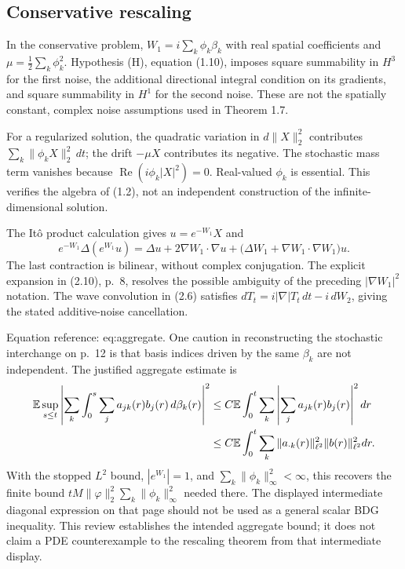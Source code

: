 \documentclass[10pt]{article}
\begin{document}
\subsection*{Conservative rescaling}
In the conservative problem, \(W_1=i\sum_k\phi_k\beta_k\) with real spatial coefficients and \(\mu=\frac12\sum_k\phi_k^2\). Hypothesis (H), equation (1.10), imposes square summability in \(H^3\) for the first noise, the additional directional integral condition on its gradients, and square summability in \(H^1\) for the second noise. These are not the spatially constant, complex noise assumptions used in Theorem 1.7.\par
For a regularized solution, the quadratic variation in \(d\|X\|_2^2\) contributes \(\sum_k\|\phi_kX\|_2^2\,dt\); the drift \(-\mu X\) contributes its negative. The stochastic mass term vanishes because \(\operatorname{Re}(i\phi_k|X|^2)=0\). Real-valued \(\phi_k\) is essential. This verifies the algebra of (1.2), not an independent construction of the infinite-dimensional solution.\par
The Itô product calculation gives \(u=e^{-W_1}X\) and \[e^{-W_1}\Delta(e^{W_1}u)
 =\Delta u+2\nabla W_1\cdot\nabla u+
       \bigl(\Delta W_1+\nabla W_1\cdot\nabla W_1\bigr)u .\] The last contraction is bilinear, without complex conjugation. The explicit expansion in (2.10), p. 8, resolves the possible ambiguity of the preceding \(|\nabla W_1|^2\) notation. The wave convolution in (2.6) satisfies \(dT_t=i|\nabla|T_t\,dt-i\,dW_2\), giving the stated additive-noise cancellation.\par
Equation reference: eq:aggregate. One caution in reconstructing the stochastic interchange on p. 12 is that basis indices driven by the same \(\beta_k\) are not independent. The justified aggregate estimate is \[\begin{aligned}
 \mathbb E\sup_{s\le t}\left|
  \sum_k\int_0^s\sum_j a_{jk}(r)b_j(r)\,d\beta_k(r)\right|^2
 &\le C\mathbb E\int_0^t
       \sum_k\left|\sum_j a_{jk}(r)b_j(r)\right|^2dr \notag\\
 &\le C\mathbb E\int_0^t
       \sum_k\|a_{\cdot k}(r)\|_{\ell^2}^2
                    \|b(r)\|_{\ell^2}^2dr. \end{aligned}\] With the stopped \(L^2\) bound, \(|e^{W_1}|=1\), and \(\sum_k\|\phi_k\|_\infty^2<\infty\), this recovers the finite bound \(tM\|\varphi\|_2^2\sum_k\|\phi_k\|_\infty^2\) needed there. The displayed intermediate diagonal expression on that page should not be used as a general scalar BDG inequality. This review establishes the intended aggregate bound; it does not claim a PDE counterexample to the rescaling theorem from that intermediate display.\par
\end{document}
